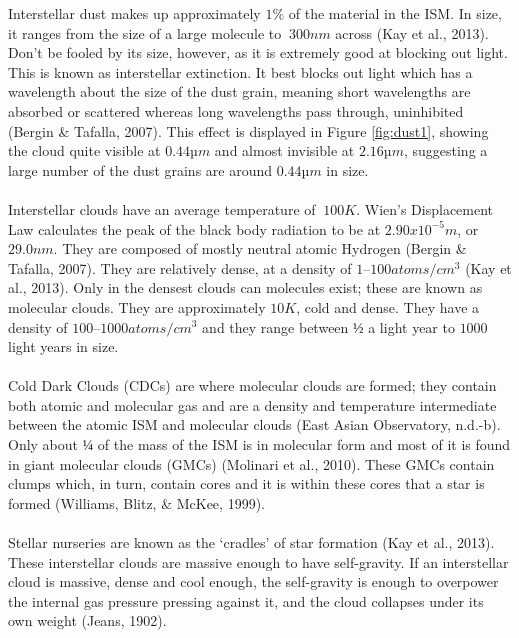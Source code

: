 \documentclass{article}
\begin{document}
Interstellar dust makes up approximately $1\%$ of the material in the ISM. In size, it ranges from the size of a large molecule to $~300 nm$ across (Kay et al., 2013). Don’t be fooled by its size, however, as it is extremely good at blocking out light. This is known as interstellar extinction. It best blocks out light which has a wavelength about the size of the dust grain, meaning short wavelengths are absorbed or scattered whereas long wavelengths pass through, uninhibited (Bergin \& Tafalla, 2007). This effect is displayed in Figure \ref{fig:dust1}, showing the cloud quite visible at $0.44 µm$ and almost invisible at $2.16 µm$, suggesting a large number of the dust grains are around $0.44 µm$ in size. 
\paragraph{}
Interstellar clouds have an average temperature of $~100 K$. Wien’s Displacement Law calculates the peak of the black body radiation to be at $2.90x10^{-5} m$, or $29.0 nm$. They are composed of mostly neutral atomic Hydrogen (Bergin \& Tafalla, 2007). They are relatively dense, at a density of $1 – 100 atoms/cm^3$ (Kay et al., 2013). Only in the densest clouds can molecules exist; these are known as molecular clouds. They are approximately $10 K$, cold and dense. They have a density of $100 – 1000 atoms/cm^3$ and they range between $½$ a light year to $1000$ light years in size. 
\paragraph{}
Cold Dark Clouds (CDCs) are where molecular clouds are formed; they contain both atomic and molecular gas and are a density and temperature intermediate between the atomic ISM and molecular clouds (East Asian Observatory, n.d.-b). Only about $¼$ of the mass of the ISM is in molecular form and most of it is found in giant molecular clouds (GMCs) (Molinari et al., 2010). These GMCs contain clumps which, in turn, contain cores and it is within these cores that a star is formed (Williams, Blitz, \& McKee, 1999). 
\paragraph{}
Stellar nurseries are known as the ‘cradles’ of star formation (Kay et al., 2013). These interstellar clouds are massive enough to have self-gravity. If an interstellar cloud is massive, dense and cool enough, the self-gravity is enough to overpower the internal gas pressure pressing against it, and the cloud collapses under its own weight (Jeans, 1902).
\end{document}
